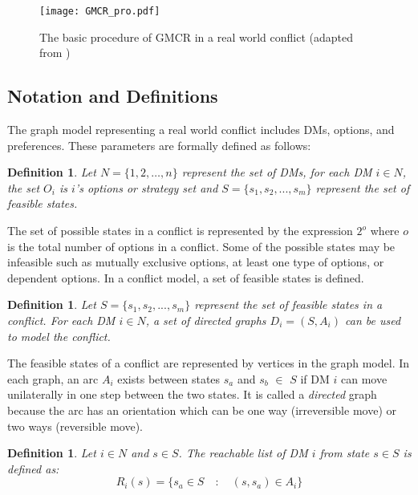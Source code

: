 \documentclass[letterpaper,12pt,titlepage,oneside,final]{book}
\newtheorem{definition}[lemma]{Definition}
\begin{document}
\begin{center}
\begin{figure}[h!]
\centering
\texttt{[image: GMCR\_pro.pdf]}

\caption{The basic procedure of GMCR in a real world conflict (adapted from \citet{fang1993})}

\label{fig:procedure_or}
\end{figure}
\end{center}

\subsection{Notation and Definitions}
The graph model representing a real world conflict includes DMs, options, and preferences. These parameters are formally defined as follows:

\begin{definition}
\rm
Let $N=\{1,2,\dots,n\}$ represent the set of DMs, for each DM $i \in N$, the set $O_{i}$ is $i$'s options or strategy set and $S=\{s_1, s_2, ..., s_m\}$ represent the set of feasible states.
\end{definition}

The set of possible states in a conflict is represented by the expression $2^o$ where $o$ is the total number of options in a conflict. Some of the possible states may be infeasible such as mutually exclusive options, at least one type of options, or dependent options. In a conflict model, a set of feasible states is defined.

\begin{definition}
\rm
Let  $S=\{s_1, s_2, ..., s_m\}$ represent the set of feasible states in a conflict. For each DM $i \in N$, a set of directed graphs $D_{i}=(S,A_{i})$ can be used to model the conflict.
\end{definition}


The feasible states of a conflict are represented by vertices in the graph model. In each graph, an arc $A_{i}$ exists between states $s_a$ and $s_b$ $\in$ $S$ if DM $i$ can move unilaterally in one step between the two states. It is called a \emph{directed} graph because the arc has an orientation which can be one way (irreversible move) or two ways (reversible move).

\begin{definition}
\rm
Let $i \in N$ and $s \in S$. The reachable list of DM $i$ from state $s \in S$ is defined as:
$$R_i(s)=\{s_a \in S \quad : \quad (s, s_a) \in A_i\}$$
\end{definition}
\end{document}
